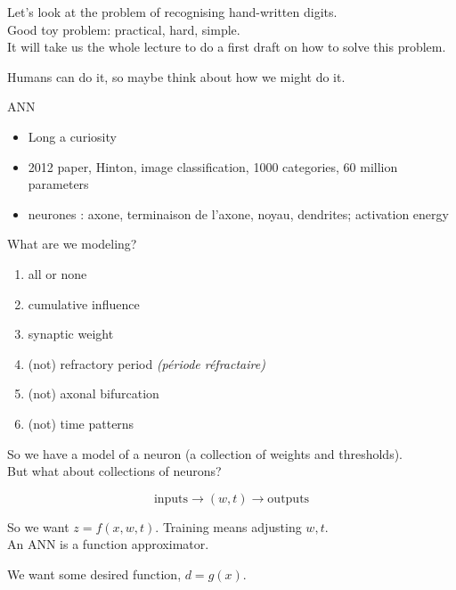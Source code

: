 
\usepackage{epsfig}



Let's look at the problem of recognising hand-written digits. \\
Good toy problem: practical, hard, simple. \\
It will take us the whole lecture to do a first draft on how to solve
this problem.

Humans can do it, so maybe think about how we might do it.



ANN
\begin{itemize}
\item Long a curiosity
\item 2012 paper, Hinton, image classification, 1000 categories, 60 million parameters
\item neurones : axone, terminaison de l'axone, noyau, dendrites; activation energy
\end{itemize}



\bigskip

What are we modeling?
\begin{enumerate}
\item all or none
\item cumulative influence
\item synaptic weight
\item (not) refractory period \textit{(période réfractaire)}
\item (not) axonal bifurcation
\item (not) time patterns
\end{enumerate}

So we have a model of a neuron (a collection of weights and thresholds).\\
But what about collections of neurons?

\begin{displaymath}
  \mbox{inputs} \rightarrow (w, t) \rightarrow \mbox{outputs}
\end{displaymath}

So we want $z = f(x, w, t)$.  Training means adjusting $w, t$.\\
An ANN is a function approximator.

We want some desired function, $d = g(x)$.



